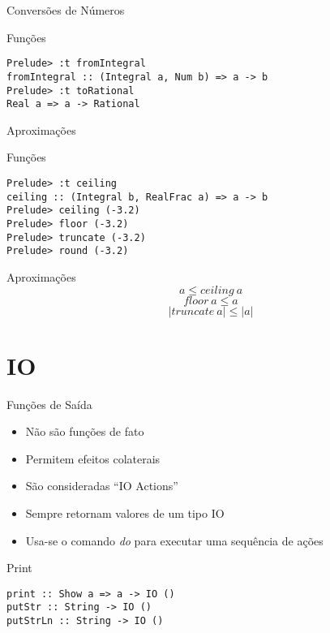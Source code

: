 \documentclass{beamer}
\begin{document}
			\begin{frame}[fragile]{Conversões de Números}
			 \begin{block}{Funções}
				\begin{lstlisting}
Prelude> :t fromIntegral
fromIntegral :: (Integral a, Num b) => a -> b
Prelude> :t toRational
Real a => a -> Rational
				\end{lstlisting}
			 \end{block}				
			\end{frame}
			
			\begin{frame}[fragile]{Aproximações}
			 \begin{block}{Funções}
			  \begin{lstlisting}
Prelude> :t ceiling
ceiling :: (Integral b, RealFrac a) => a -> b
Prelude> ceiling (-3.2)
Prelude> floor (-3.2)
Prelude> truncate (-3.2)
Prelude> round (-3.2)
			  \end{lstlisting}
			 \end{block}
			\end{frame}
			
			\begin{frame}{Aproximações}
			 \[ a \leq ceiling~ a\]
			 \[ floor~ a \leq a\]
			 \[ \left|truncate~ a\right| \leq \left|a\right|\]
			\end{frame}		
	
	\section{IO}
	
	\begin{frame}{}
	\end{frame}
	
		\begin{frame}[fragile]{Funções de Saída}
		 \begin{itemize}
		  \item Não são funções de fato
		  \item Permitem efeitos colaterais
		  \item São consideradas ``IO Actions''
		  \item Sempre retornam valores de um tipo IO
		  \item Usa-se o comando \textit{do} para executar uma sequência de ações
		 \end{itemize}
		 
		 \begin{block}{Print}
		  \begin{lstlisting}
print :: Show a => a -> IO ()
putStr :: String -> IO ()
putStrLn :: String -> IO ()
		  \end{lstlisting}
		 \end{block}
		\end{frame}
		
\end{document}
